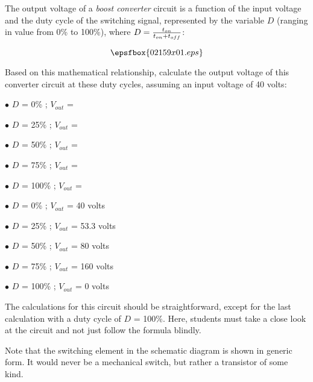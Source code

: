 

The output voltage of a {\it boost converter} circuit is a function of the input voltage and the duty cycle of the switching signal, represented by the variable $D$ (ranging in value from 0\% to 100\%), where $D = {{t_{on}} \over {t_{on} + t_{off}}}$:


$$\epsfbox{02159x01.eps}$$

Based on this mathematical relationship, calculate the output voltage of this converter circuit at these duty cycles, assuming an input voltage of 40 volts:

\medskip
\goodbreak
\item{$\bullet$} $D$ = 0\% ; $V_{out}$ = 
\item{$\bullet$} $D$ = 25\% ; $V_{out}$ =
\item{$\bullet$} $D$ = 50\% ; $V_{out}$ =
\item{$\bullet$} $D$ = 75\% ; $V_{out}$ =
\item{$\bullet$} $D$ = 100\% ; $V_{out}$ =
\medskip







\medskip
\goodbreak
\item{$\bullet$} $D$ = 0\% ; $V_{out}$ = 40 volts
\item{$\bullet$} $D$ = 25\% ; $V_{out}$ = 53.3 volts
\item{$\bullet$} $D$ = 50\% ; $V_{out}$ = 80 volts
\item{$\bullet$} $D$ = 75\% ; $V_{out}$ = 160 volts
\item{$\bullet$} $D$ = 100\% ; $V_{out}$ = 0 volts
\medskip







The calculations for this circuit should be straightforward, except for the last calculation with a duty cycle of $D$ = 100\%.  Here, students must take a close look at the circuit and not just follow the formula blindly.  

Note that the switching element in the schematic diagram is shown in generic form.  It would never be a mechanical switch, but rather a transistor of some kind.




